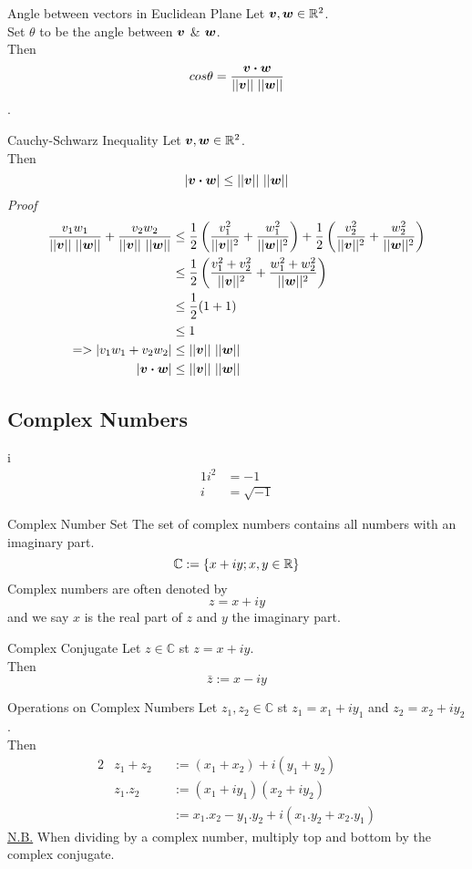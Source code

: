 \documentclass[11pt,a4paper]{article}
\begin{document}
\subtitle{Remark 1.09 - }{Angle between vectors in Euclidean Plane}
Let $\boldsymbol{v}, \boldsymbol{w} \in \mathbb{R}^2$. \\
Set $\theta$ to be the angle between $\boldsymbol{v}$ \& $\boldsymbol{w}$. \\
Then $$cos\theta = \frac{\boldsymbol{v} \boldsymbol{\cdot} \boldsymbol{w}}{||\boldsymbol{v}||\ ||\boldsymbol{w}||}$$.

\subtitle{Theorem 1.10 - }{Cauchy-Schwarz Inequality}
Let $\boldsymbol{v}, \boldsymbol{w} \in \mathbb{R}^2$. \\
Then $$|\boldsymbol{v} \boldsymbol{\cdot} \boldsymbol{w}| \leq ||\boldsymbol{v}||\ ||\boldsymbol{w}||$$
%
\textit{Proof}
\begin{align*}
  \frac{v_1w_1}{||\boldsymbol{v}||\ ||\boldsymbol{w}||} + \frac{v_2w_2}{||\boldsymbol{v}||\ ||\boldsymbol{w}||} &\leq \frac{1}{2}\left(\frac{v_{1}^{2}}{||\boldsymbol{v}||^2} + \frac{w_{1}^{2}}{||\boldsymbol{w}||^2}\right) + \frac{1}{2}\left(\frac{v_{2}^{2}}{||\boldsymbol{v}||^2} + \frac{w_{2}^{2}}{||\boldsymbol{w}||^2}\right) \\
  &\leq \frac{1}{2}\left(\frac{v_{1}^{2} + v_{2}^{2}}{||\boldsymbol{v}||^2} + \frac{w_{1}^{2} + w_{2}^{2}}{||\boldsymbol{w}||^2}\right) \\
  &\leq \frac{1}{2}(1 + 1) \\
  &\leq 1 \\
  => |v_1w_1 + v_2w_2| &\leq ||\boldsymbol{v}||\ ||\boldsymbol{w}|| \\
  |\boldsymbol{v} \boldsymbol{\cdot} \boldsymbol{w}| &\leq ||\boldsymbol{v}||\ ||\boldsymbol{w}|| \\
\end{align*}

\subsection{Complex Numbers}

\subtitle{Definition 1.11 - }{i}
\begin{alignat*}{1}
  i^2 &= -1 \\
  i &= \sqrt{-1}
\end{alignat*}

\subtitle{Definition 1.12 - }{Complex Number Set}
The set of complex numbers contains all numbers with an imaginary part. $$\mathbb{C} := \left\{x + iy; x,y \in \mathbb{R}\right\}$$
Complex numbers are often denoted by $$z = x + iy$$ and we say $x$ is the real part of $z$ and $y$ the imaginary part.

\subtitle{Definition 1.13 - }{Complex Conjugate}
Let $z \in \mathbb{C}$ st $z = x + iy$. \\
Then $$\bar{z} := x - iy$$
%
\newpage
%
\subtitle{Theorem 1.14 - }{Operations on Complex Numbers}
Let $z_1,z_2 \in \mathbb{C}$ st $z_1 = x_1 + iy_1$ and $z_2 = x_2 + iy_2$. \\
Then \begin{alignat*}{2}
  &z_1 + z_2 &&:= (x_1 + x_2) + i(y_1 + y_2) \\
  &z_1.z_2 &&:= (x_1 + iy_1)(x_2 + iy_2) \\
  & && := x_1.x_2 - y_1.y_2 + i(x_1.y_2 + x_2.y_1)
\end{alignat*}
\underline{N.B.} When dividing by a complex number, multiply top and bottom by the complex conjugate. \\
\end{document}
